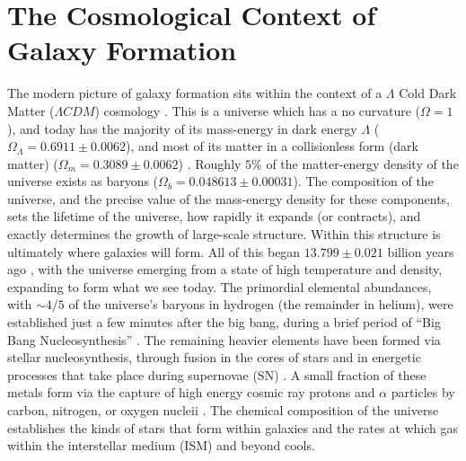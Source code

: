 \section{The Cosmological Context of Galaxy Formation} 
The modern picture of galaxy formation sits within the context of a $\Lambda$
Cold Dark Matter ($\Lambda CDM$) cosmology
\citep{Rees1977,White1978,Blumenthal1984,Mo1998}.  This is a universe which has
a no curvature ($\Omega = 1$), and today has the majority of its mass-energy in
dark energy $\Lambda$ ($\Omega_\Lambda = 0.6911\pm0.0062$), and most of its
matter in a collisionless form (dark matter) ($\Omega_m = 0.3089\pm0.0062$)
\citep{Planck2015b}.  Roughly $5\%$ of the matter-energy density of the universe
exists as baryons ($\Omega_b = 0.048613\pm0.00031$).  The composition of the
universe, and the precise value of the mass-energy density for these components,
sets the lifetime of the universe, how rapidly it expands (or contracts), and
exactly determines the growth of large-scale structure.  Within this structure
is ultimately where galaxies will form.  All of this began $13.799\pm0.021$
billion years ago \citep{Planck2015b}, with the universe emerging from a state
of high temperature and density, expanding to form what we see today.  The
primordial elemental abundances, with $\sim4/5$ of the universe's baryons in
hydrogen (the remainder in helium), were established just a few minutes after
the big bang, during a brief period of ``Big Bang Nucleosynthesis''
\citep{Alpher1948}.  The remaining heavier elements have been formed via stellar
nucleosynthesis, through fusion in the cores of stars and in energetic processes
that take place during supernovae (SN) \citep{Wagoner1967}. A small fraction of
these metals form via the capture of high energy cosmic ray protons and $\alpha$
particles by carbon, nitrogen, or oxygen nucleii \citep{Reeves1970}.  The
chemical composition of the universe establishes the kinds of stars that form
within galaxies and the rates at which gas within the interstellar medium (ISM)
and beyond cools.

